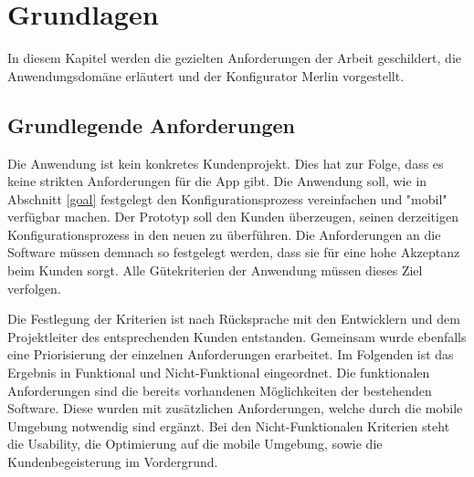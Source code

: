 \chapter{Grundlagen} \label{chapter_2}

In diesem Kapitel werden die gezielten Anforderungen der Arbeit geschildert, die Anwendungsdomäne erläutert und der Konfigurator Merlin vorgestellt. 

\section{Grundlegende Anforderungen}
Die Anwendung ist kein konkretes Kundenprojekt. Dies hat zur Folge, dass es keine strikten Anforderungen für die App gibt. Die Anwendung soll, wie in Abschnitt \ref{goal} festgelegt den Konfigurationsprozess vereinfachen und "mobil" verfügbar machen. Der Prototyp soll den Kunden überzeugen, seinen derzeitigen Konfigurationsprozess in den neuen zu überführen. Die Anforderungen an die Software müssen demnach so festgelegt werden, dass sie für eine hohe Akzeptanz beim Kunden sorgt. Alle Gütekriterien der Anwendung müssen dieses Ziel verfolgen. \par

Die Festlegung der Kriterien ist nach Rücksprache mit den Entwicklern und dem Projektleiter des entsprechenden Kunden entstanden. Gemeinsam wurde ebenfalls eine Priorisierung der einzelnen Anforderungen erarbeitet. Im Folgenden ist das Ergebnis in Funktional und Nicht-Funktional eingeordnet. Die funktionalen Anforderungen sind die bereits vorhandenen Möglichkeiten der bestehenden Software. Diese wurden mit zusätzlichen Anforderungen, welche durch die mobile Umgebung notwendig sind ergänzt. Bei den Nicht-Funktionalen Kriterien steht die Usability, die Optimierung auf die mobile Umgebung, sowie die Kundenbegeisterung im Vordergrund.

